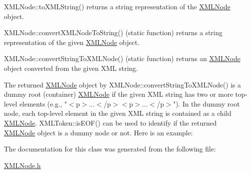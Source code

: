 \begin{DoxyItemize}
\item X\+M\+L\+Node\+::to\+X\+M\+L\+String() returns a string representation of the \hyperlink{class_x_m_l_node}{X\+M\+L\+Node} object.\end{DoxyItemize}
\begin{DoxyItemize}
\item X\+M\+L\+Node\+::convert\+X\+M\+L\+Node\+To\+String() (static function) returns a string representation of the given \hyperlink{class_x_m_l_node}{X\+M\+L\+Node} object.\end{DoxyItemize}
\begin{DoxyItemize}
\item X\+M\+L\+Node\+::convert\+String\+To\+X\+M\+L\+Node() (static function) returns an \hyperlink{class_x_m_l_node}{X\+M\+L\+Node} object converted from the given X\+ML string.\end{DoxyItemize}
The returned \hyperlink{class_x_m_l_node}{X\+M\+L\+Node} object by X\+M\+L\+Node\+::convert\+String\+To\+X\+M\+L\+Node() is a dummy root (container) \hyperlink{class_x_m_l_node}{X\+M\+L\+Node} if the given X\+ML string has two or more top-\/level elements (e.\+g., "{\ttfamily $<$p$>$...$<$/p$>$$<$p$>$...$<$/p$>$}"). In the dummy root node, each top-\/level element in the given X\+ML string is contained as a child \hyperlink{class_x_m_l_node}{X\+M\+L\+Node}. X\+M\+L\+Token\+::is\+E\+O\+F() can be used to identify if the returned \hyperlink{class_x_m_l_node}{X\+M\+L\+Node} object is a dummy node or not. Here is an example\+: 

The documentation for this class was generated from the following file\+:\begin{DoxyCompactItemize}
\item 
\hyperlink{_x_m_l_node_8h}{X\+M\+L\+Node.\+h}\end{DoxyCompactItemize}
